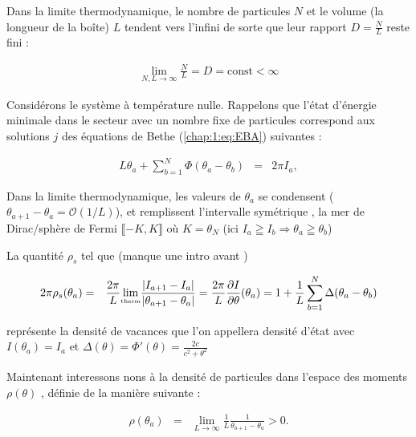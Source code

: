 Dans la limite thermodynamique, le nombre de particules \( N \) et le volume 
(la longueur de la boîte) \( L \) tendent vers l'infini de sorte que leur rapport 
\( D = \frac{N}{L} \) reste fini :

\begin{eqnarray*}
	\lim_{N, L \to \infty} \frac{N}{L} = D = \mbox{const} < \infty	
\end{eqnarray*}

Considérons le système à température nulle. Rappelons que l'état 
d'énergie minimale dans le secteur avec un nombre fixe de particules 
correspond aux solutions \( j \) des équations de Bethe (\eqref{chap:1:eq:EBA}) suivantes :

\begin{eqnarray*}
	L \theta_a + \sum_{b = 1}^N \Phi ( \theta_a - \theta_b ) & = & 2\pi I_a ,	
\end{eqnarray*}

Dans la limite thermodynamique, les valeurs de \( \theta_a \) se condensent (\(\theta_{a+1} - \theta_a = \mathcal{O}(1/L)\)), et remplissent l'intervalle symétrique , la mer de Dirac/sphère de Fermi  \(\llbracket-K, K\rrbracket\) où $K = \theta_N$ (ici $I_a \geqq I_b \Rightarrow \theta_a \geqq \theta_b$)

La quantité $\rho_s$ tel que (manque une intro avant ) 

\begin{eqnarray*}
	2\pi \rho_s (\theta_a) & = & \frac{2\pi}{L}\underset{\tiny \mbox{therm}}{\lim} \frac{ \vert I_{a+1} - I_{a} \vert}{ \vert \theta_{a+1} - \theta_a \vert} = \frac{2\pi}{L} \frac{ \partial I}{\partial \theta } ( \theta_a ) = 1 	+ \frac{1}{L}\sum_{b = 1}^N \Delta (\theta_a - \theta_b)
\end{eqnarray*}

représente la densité de vacances que l'on appellera densité d'état avec $I(\theta_a) = I_a$ et  $\Delta(\theta) = \Phi'(\theta)  = \frac{2c}{c^2 + \theta^2}$

Maintenant interessons nons à la densité de particules dans l'espace des moments \( \rho(\theta) \) , définie de la manière suivante :

\begin{eqnarray*}
	\rho(\theta_a)  &=  &\lim_{L \to \infty} \frac{1}{L} \frac{1}{\theta_{a+1} - \theta_a} > 0.	
\end{eqnarray*}

